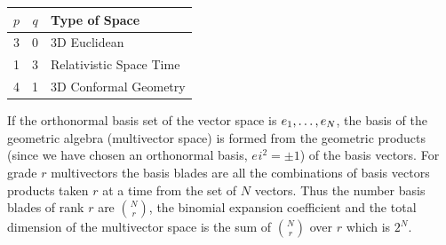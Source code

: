 \begin{center}
\begin{tabular}{ccl} \\
$p$ & $q$ & Type of Space \\ \hline 
 3  &  0  & 3D Euclidean \\
 1  &  3  & Relativistic Space Time \\
 4  &  1  & 3D Conformal Geometry
\end{tabular}
\end{center}

If the orthonormal basis set of the vector space is ${e_{1}},\dots,{e_{N}}$, the 
basis of the geometric algebra (multivector space) is formed from the geometric
products (since we have chosen an orthonormal basis, $e_{}i^{2}=\pm 1$) of the basis vectors. For
grade $r$ multivectors the basis blades are all the combinations of basis
vectors products taken $r$ at a time from the set of $N$ vectors. Thus the number basis
blades of rank $r$ are $N\choose r$, the binomial expansion coefficient and
the total dimension of the multivector space is the sum of $N\choose r$ over
$r$ which is $2^{N}$. 
